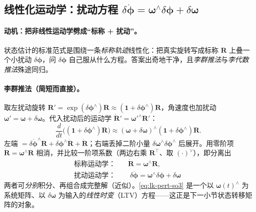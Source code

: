 \subsection{线性化运动学：扰动方程 \texorpdfstring{$\delta\dot{\boldsymbol{\phi}}=\boldsymbol{\omega}^\wedge\delta\boldsymbol{\phi}+\delta\boldsymbol{\omega}$}{delta-phidot}}
\label{subsec:lie-linkin}

\paragraph{动机：把非线性运动学劈成“标称 + 扰动”。}状态估计的标准范式是围绕一条\emph{标称轨迹}线性化：把真实旋转写成标称 $\mathbf{R}$ 上叠一个小扰动 $\delta\boldsymbol{\phi}$，问 $\delta\boldsymbol{\phi}$ 自己服从什么方程。答案出奇地干净，且\emph{李群推法}与\emph{李代数推法}殊途同归。

\paragraph{李群推法（简短而直接）。}取左扰动旋转 $\mathbf{R}'=\exp(\delta\boldsymbol{\phi}^\wedge)\mathbf{R}\approx(\mathbf{1}+\delta\boldsymbol{\phi}^\wedge)\mathbf{R}$，角速度也加扰动 $\boldsymbol{\omega}'=\boldsymbol{\omega}+\delta\boldsymbol{\omega}$。代入扰动后的运动学 $\dot{\mathbf{R}}'=\boldsymbol{\omega}'^\wedge\mathbf{R}'$：
\begin{equation}
  \frac{d}{dt}\big((\mathbf{1}+\delta\boldsymbol{\phi}^\wedge)\mathbf{R}\big)\approx(\boldsymbol{\omega}+\delta\boldsymbol{\omega})^\wedge(\mathbf{1}+\delta\boldsymbol{\phi}^\wedge)\mathbf{R}.
  \label{eq:lk-pert-expand}
\end{equation}
左端 $=\delta\dot{\boldsymbol{\phi}}^\wedge\mathbf{R}+\delta\boldsymbol{\phi}^\wedge\dot{\mathbf{R}}+\dot{\mathbf{R}}$；右端丢掉二阶小量 $\delta\boldsymbol{\omega}^\wedge\delta\boldsymbol{\phi}^\wedge$ 后展开。用零阶项 $\dot{\mathbf{R}}=\boldsymbol{\omega}^\wedge\mathbf{R}$ 相消，并比较一阶项系数（两边右乘 $\mathbf{R}^\top$、取 $(\cdot)^\vee$），即分离出
\begin{align}
  \text{标称运动学：}&\quad \dot{\mathbf{R}}=\boldsymbol{\omega}^\wedge\mathbf{R}, \label{eq:lk-nominal-so3}\\
  \text{扰动运动学：}&\quad \boxed{\;\delta\dot{\boldsymbol{\phi}}=\boldsymbol{\omega}^\wedge\delta\boldsymbol{\phi}+\delta\boldsymbol{\omega}\;}\label{eq:lk-pert-so3}
\end{align}
两者可\emph{分别}积分、再组合成完整解（近似）。\cref{eq:lk-pert-so3} 是一个以 $\boldsymbol{\omega}(t)^\wedge$ 为系统矩阵、以 $\delta\boldsymbol{\omega}$ 为输入的\emph{线性时变}（LTV）方程——这正是下一小节状态转移矩阵的对象。

